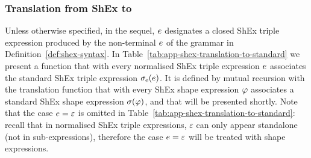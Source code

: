 

\subsubsection{Translation from ShEx to \stshex}

Unless otherwise specified, in the sequel, $e$ designates a closed  ShEx
triple expression produced by the non-terminal $e$ of the grammar in
Definition~\ref{def:shex-syntax}.
In Table~\ref{tab:app-shex-translation-to-standard} we present a function that
with every normalised ShEx triple expression $e$ associates the standard ShEx
triple expression $\sigma_{\text{e}}(e)$.
It is defined by mutual recursion with the translation function that with every
ShEx shape expression $\mathit{\varphi}$ associates a standard ShEx shape expression
$\sigma(\mathit{\varphi})$, and that will be presented shortly.
Note that the case $e = \varepsilon$ is omitted in
Table~\ref{tab:app-shex-translation-to-standard}: recall that in normalised ShEx
triple expressions, $\varepsilon$ can only appear standalone (not in
sub-expressions), therefore the case $e = \varepsilon$ will be treated with
shape expressions.

